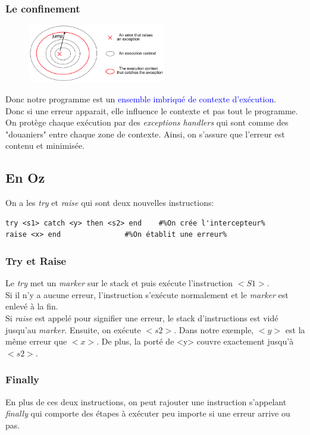 \documentclass{report}
\begin{document}
\subsubsection{Le confinement}
\begin{figure}
\centering
\includegraphics[width=6cm]{img/handler.png}
\end{figure}
Donc notre programme est un \textcolor{blue}{ensemble imbriqué de contexte d'exécution}.\\
Donc si une erreur apparait, elle influence le contexte et pas tout le programme.\\
On protège chaque exécution par des \textit{exceptions handlers} qui sont comme des "douaniers" entre chaque zone de contexte. Ainsi, on s'assure que l'erreur est contenu et minimisée.

\subsection{En Oz}
On a les \textit{try} et \textit{raise} qui sont deux nouvelles instructions:
\begin{lstlisting}[escapechar=\%]
try <s1> catch <y> then <s2> end	#%On crée l'intercepteur%
raise <x> end				#%On établit une erreur%
\end{lstlisting}

\subsubsection{Try et Raise}
Le \textit{try} met un \textit{marker} sur le stack et puis exécute l'instruction $<S1>$.\\
Si il n'y a aucune erreur, l'instruction s'exécute normalement et le \textit{marker} est enlevé à la fin.\\
Si \textit{raise} est appelé pour signifier une erreur, le stack d'instructions est vidé jusqu'au \textit{marker}. Ensuite, on exécute $<s2>$. Dans notre exemple, $<y>$ est la même erreur que $<x>$. De plus, la porté de <y> couvre exactement jusqu'à $<s2>$.

\subsubsection{Finally}
En plus de ces deux instructions, on peut rajouter une instruction s'appelant \textit{finally} qui comporte des étapes à exécuter peu importe si une erreur arrive ou pas.
\end{document}
